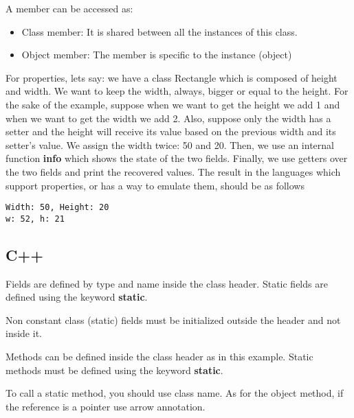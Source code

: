 \documentclass{KodeBook}
\begin{document}
A member can be accessed as: 
\begin{itemize}
	\item Class member: It is shared between all the instances of this class.
	\item Object member: The member is specific to the instance (object)
\end{itemize}

For properties, lets say: we have a class Rectangle which is composed of height and width. 
We want to keep the width, always, bigger or equal to the height.
For the sake of the example, suppose when we want to get the height we add 1 and when we want to get the width we add 2.
Also, suppose only the width has a setter and the height will receive its value based on the previous width and its setter's value.
We assign the width twice: 50 and 20. 
Then, we use an internal function \textbf{info} which shows the state of the two fields. 
Finally, we use getters over the two fields and print the recovered values. 
The result in the languages which support properties, or has a way to emulate them, should be as follows
\begin{lstlisting}[style=shellStyle]
Width: 50, Height: 20
w: 52, h: 21
\end{lstlisting}  

\subsection{C++}

Fields are defined by type and name inside the class header. 
Static fields are defined using the keyword \textbf{static}.



Non constant class (static) fields must be initialized outside the header and not inside it. 

 

Methods can be defined inside the class header as in this example.
Static methods must be defined using the keyword \textbf{static}. 



To call a static method, you should use class name. 
As for the object method, if the reference is a pointer use arrow annotation.


\end{document}
